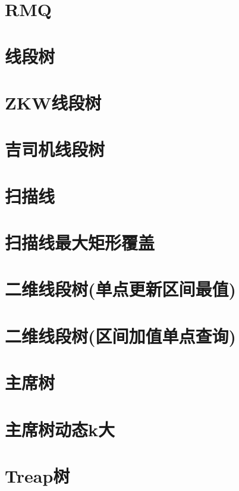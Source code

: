 \section{RMQ}
\raggedbottom
\hrulefill
\section{线段树}
\raggedbottom
\hrulefill
\section{ZKW线段树}
\raggedbottom
\hrulefill
\section{吉司机线段树}
\raggedbottom
\hrulefill
\section{扫描线}
\raggedbottom
\hrulefill
\section{扫描线最大矩形覆盖}
\raggedbottom
\hrulefill
\section{二维线段树(单点更新区间最值)}
\raggedbottom
\hrulefill
\section{二维线段树(区间加值单点查询)}
\raggedbottom
\hrulefill
\section{主席树}
\raggedbottom
\hrulefill
\section{主席树动态k大}
\raggedbottom
\hrulefill
\section{Treap树}
\raggedbottom
\hrulefill
